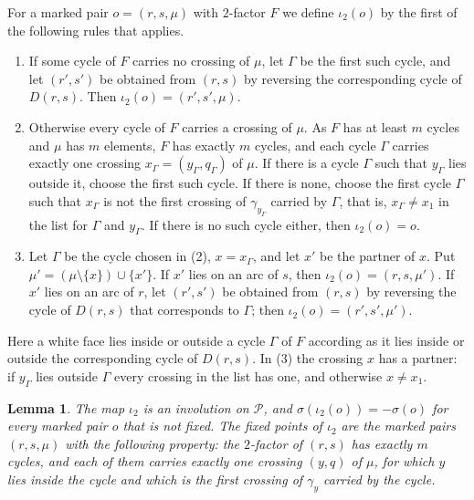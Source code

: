 \documentclass[a4paper]{amsart}
\newtheorem{lemma}[theorem]{Lemma}
\newcommand{\cP}{\mathcal P}
\begin{document}
For a marked pair $o=(r,s,\mu)$ with $2$-factor $F$ we define $\iota_2(o)$ by the first of the following rules that applies.
\begin{enumerate}
\item If some cycle of $F$ carries no crossing of $\mu$, let $\Gamma$ be the first such cycle, and let $(r',s')$ be obtained from $(r,s)$ by reversing the corresponding cycle of $D(r,s)$. Then $\iota_2(o)=(r',s',\mu)$.
\item Otherwise every cycle of $F$ carries a crossing of $\mu$. As $F$ has at least $m$ cycles and $\mu$ has $m$ elements, $F$ has exactly $m$ cycles, and each cycle $\Gamma$ carries exactly one crossing $x_\Gamma=(y_\Gamma,q_\Gamma)$ of $\mu$. If there is a cycle $\Gamma$ such that $y_\Gamma$ lies outside it, choose the first such cycle. If there is none, choose the first cycle $\Gamma$ such that $x_\Gamma$ is not the first crossing of $\gamma_{y_\Gamma}$ carried by $\Gamma$, that is, $x_\Gamma\ne x_1$ in the list for $\Gamma$ and $y_\Gamma$. If there is no such cycle either, then $\iota_2(o)=o$.
\item Let $\Gamma$ be the cycle chosen in (2), $x=x_\Gamma$, and let $x'$ be the partner of $x$. Put $\mu'=(\mu\setminus\{x\})\cup\{x'\}$. If $x'$ lies on an arc of $s$, then $\iota_2(o)=(r,s,\mu')$. If $x'$ lies on an arc of $r$, let $(r',s')$ be obtained from $(r,s)$ by reversing the cycle of $D(r,s)$ that corresponds to $\Gamma$; then $\iota_2(o)=(r',s',\mu')$.
\end{enumerate}
Here a white face lies inside or outside a cycle $\Gamma$ of $F$ according as it lies inside or outside the corresponding cycle of $D(r,s)$.
In (3) the crossing $x$ has a partner: if $y_\Gamma$ lies outside $\Gamma$ every crossing in the list has one, and otherwise $x\neq x_1$.

\begin{lemma}\label{two}
The map $\iota_2$ is an involution on $\cP$, and $\sigma(\iota_2(o))=-\sigma(o)$ for every marked pair $o$ that is not fixed.
The fixed points of $\iota_2$ are the marked pairs $(r,s,\mu)$ with the following property: the $2$-factor of $(r,s)$ has exactly $m$ cycles, and each of them carries exactly one crossing $(y,q)$ of $\mu$, for which $y$ lies inside the cycle and which is the first crossing of $\gamma_y$ carried by the cycle.
\end{lemma}
\end{document}
